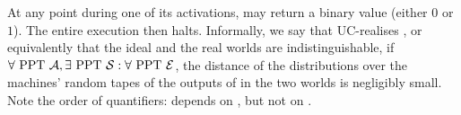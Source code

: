   At any point during one of its activations, \environment may return a binary
  value (either $0$ or $1$). The entire execution then halts. Informally, we say that \prot
  UC-realises \func, or equivalently that the ideal and the real worlds are
  indistinguishable, if $\forall \text{ PPT } \mathcal{A}, \exists \text{ PPT }
  \mathcal{S}: \forall \text{ PPT } \mathcal{E}$, the distance of the
  distributions over the machines' random tapes of the outputs of \environment
  in the two worlds is negligibly small. Note the order of quantifiers:
  \simulator depends on \adversary, but not on \environment.
